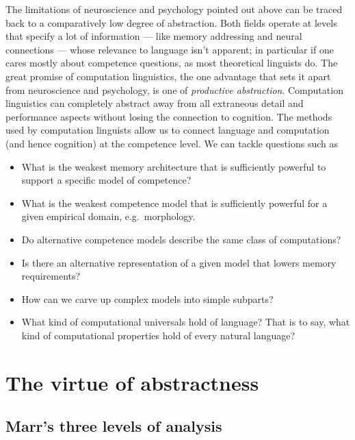 The limitations of neuroscience and psychology pointed out above can be traced back to a comparatively low degree of abstraction.
Both fields operate at levels that specify a lot of information --- like memory addressing and neural connections --- whose relevance to language isn't apparent; in particular if one cares mostly about competence questions, as most theoretical linguists do.
The great promise of computation linguistics, the one advantage that sets it apart from neuroscience and psychology, is one of \emph{productive abstraction}.
Computation linguistics can completely abstract away from all extraneous detail and performance aspects without losing the connection to cognition.
The methods used by computation linguists allow us to connect language and computation (and hence cognition) at the competence level. 
We can tackle questions such as
%
\begin{itemize}
    \item What is the weakest memory architecture that is sufficiently powerful to support a specific model of competence?
    \item What is the weakest competence model that is sufficiently powerful for a given empirical domain, e.g.\ morphology.
    \item Do alternative competence models describe the same class of computations?
    \item Is there an alternative representation of a given model that lowers memory requirements?
    \item How can we carve up complex models into simple subparts? 
    \item What kind of computational universals hold of language?
          That is to say, what kind of computational properties hold of every natural language?
\end{itemize}

\section{The virtue of abstractness}
\label{sec:formal_abstractness}

\subsection{Marr's three levels of analysis}
\label{ssec:formal_abstracness_marr}

